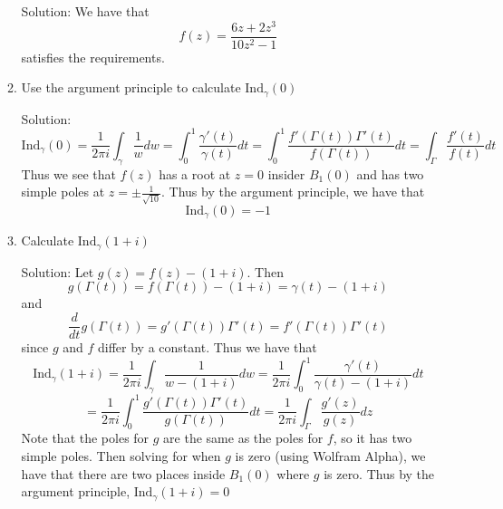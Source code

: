 \documentclass[11pt]{article}
\newcommand{\Ind}{\text{Ind}}
\begin{document}
\begin{enumerate}[(1)]
\begin{enumerate}
Solution: We have that 
$$ f(z) = \frac{6z + 2z^3}{10z^2 - 1} $$
satisfies the requirements.

\item Use the argument principle to calculate $\Ind_\gamma(0)$

Solution: 
$$ \Ind_\gamma(0) = \frac{1}{2\pi i} \int_\gamma \frac{1}{w} dw = \int_0^1 \frac{\gamma'(t)}{\gamma(t)}dt = \int_0^1 \frac{f'(\Gamma(t))\Gamma'(t)}{f(\Gamma(t))}dt = \int_\Gamma \frac{f'(t)}{f(t)}dt $$
Thus we see that $f(z)$ has a root at $z = 0$ insider $B_1(0)$ and has two simple poles at $z = \pm \frac{1}{\sqrt{10}}$. Thus by the argument principle, we have that 
$$ \Ind_\gamma(0) = -1 $$

\item Calculate $\Ind_\gamma(1 + i)$

Solution: Let $g(z) = f(z) - (1 + i)$. Then 
$$g(\Gamma(t)) = f(\Gamma(t)) - (1 + i) = \gamma(t) - (1 + i)$$
and 
$$ \frac{d}{dt} g(\Gamma(t)) = g'(\Gamma(t))\Gamma'(t) = f'(\Gamma(t))\Gamma'(t) $$
since $g$ and $f$ differ by a constant. Thus we have that 
$$ \Ind_{\gamma}(1+i) = \frac{1}{2\pi i} \int_\gamma \frac{1}{w - (1+i)}dw = \frac{1}{2\pi i} \int_0^1 \frac{\gamma'(t)}{\gamma(t) - (1 + i)} dt$$
$$ = \frac{1}{2\pi i} \int_0^1 \frac{g'(\Gamma(t)) \Gamma'(t)}{g(\Gamma(t))}dt = \frac{1}{2\pi i} \int_\Gamma \frac{g'(z)}{g(z)}dz $$
Note that the poles for $g$ are the same as the poles for $f$, so it has two simple poles. Then solving for when $g$ is zero (using Wolfram Alpha), we have that there are two places inside $B_1(0)$ where $g$ is zero. Thus by the argument principle, $\Ind_\gamma(1+i) = 0$

\end{enumerate}

\end{enumerate}
\end{document}
